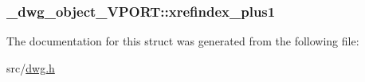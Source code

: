 \hypertarget{struct__dwg__object__VPORT_ac95f2ff052649a2523bccc1f45261050}{
\subsubsection[{xrefindex\-\_\-plus1}]{ {\bf \-\_\-dwg\-\_\-object\-\_\-\-V\-P\-O\-R\-T\-::xrefindex\-\_\-plus1}}}\label{struct__dwg__object__VPORT_ac95f2ff052649a2523bccc1f45261050}


\-The documentation for this struct was generated from the following file\-:\begin{DoxyCompactItemize}
\item 
src/\hyperlink{dwg_8h}{dwg.\-h}\end{DoxyCompactItemize}
